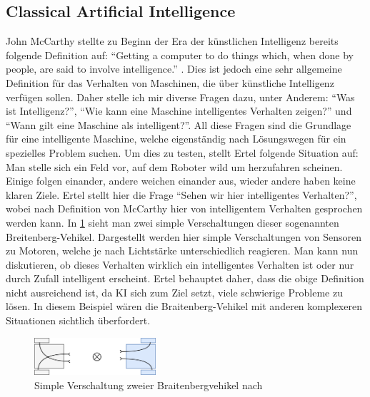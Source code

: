     \subsection{Classical Artificial Intelligence}
    John McCarthy stellte zu Beginn der Era der künstlichen Intelligenz bereits folgende Definition
    auf: ``Getting a computer to do things which, when done by people, are said to involve intelligence.'' 
    \cite[p. 1]{ertel2016grundkurs}. Dies ist jedoch eine sehr allgemeine Definition für das 
    Verhalten von Maschinen, die über künstliche Intelligenz verfügen sollen. Daher stelle ich mir 
    diverse Fragen dazu, unter Anderem: ``Was ist Intelligenz?'', ``Wie kann eine Maschine intelligentes
    Verhalten zeigen?'' und ``Wann gilt eine Maschine als intelligent?''. All diese Fragen sind die 
    Grundlage für eine intelligente Maschine, welche eigenständig nach Lösungswegen für ein spezielles
    Problem suchen. Um dies zu testen, stellt Ertel folgende Situation auf: Man stelle sich ein Feld 
    vor, auf dem Roboter wild um herzufahren scheinen. Einige folgen einander, andere weichen einander 
    aus, wieder andere haben keine klaren Ziele. \cite[p. 2]{ertel2016grundkurs} Ertel stellt hier die
    Frage ``Sehen wir hier intelligentes Verhalten?'', wobei nach Definition von McCarthy hier von 
    intelligentem Verhalten gesprochen werden kann. In \ref{pic:braitenberg-vehikel} sieht man zwei 
    simple Verschaltungen dieser sogenannten Breitenberg-Vehikel. Dargestellt werden hier simple 
    Verschaltungen von Sensoren zu Motoren, welche je nach Lichtstärke unterschiedlich reagieren. 
    Man kann nun diskutieren, ob dieses Verhalten wirklich ein intelligentes Verhalten ist oder
    nur durch Zufall intelligent erscheint. Ertel behauptet daher, dass die obige Definition nicht
    ausreichend ist, da KI sich zum Ziel setzt, viele schwierige Probleme zu lösen. In diesem Beispiel
    wären die Braitenberg-Vehikel mit anderen komplexeren Situationen sichtlich überfordert.
    
    \begin{figure}[h]\begin{center}
        \includegraphics[width=0.4\textwidth]{figures/braitenberg-roboter.png}
        \caption[Verschaltung Braitenberg-Vehikel]{Simple Verschaltung zweier Braitenbergvehikel nach \cite{ertel2016grundkurs}}
        \label{pic:braitenberg-vehikel}
    \end{center}\end{figure}
    
